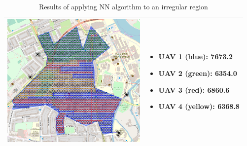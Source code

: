\begin{table}[h!]
\begin{tabular}{ | c | m{5cm} | }
    \begin{minipage}[c][68mm][c]{.6\textwidth}
      \includegraphics[width=\linewidth, height=66mm]{Chapters/MultiAgentCoverage/MultipleTravellingSalesman/Figs/IrregularRegion/FourRAVSecondAttempt.PNG}
    \end{minipage}
    &
    \begin{itemize}[leftmargin=*]
    \item[] UAV 1 (blue): 7673.2
    \item[] UAV 2 (green): 6354.0
    \item[] UAV 3 (red): 6860.6
    \item[] UAV 4 (yellow): 6368.8
    \end{itemize}
    \\
    \hline
  \end{tabular}
  \caption{Results of applying NN algorithm to an irregular region}\label{table:NNAlgoResultsIrregular}
\end{table}
\pagebreak



































